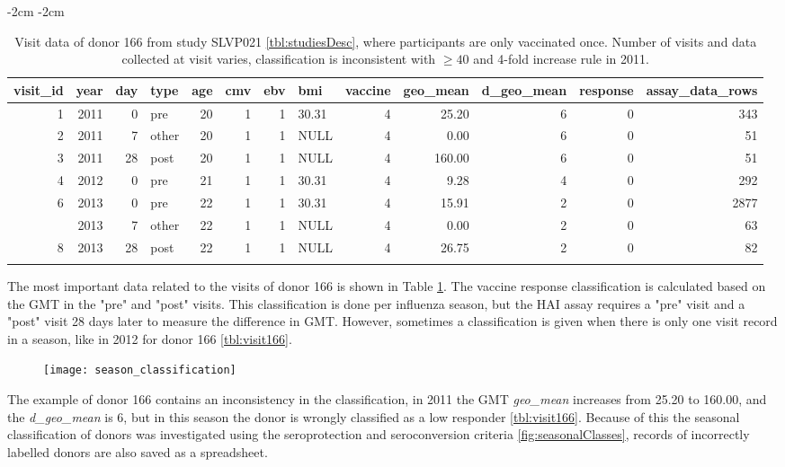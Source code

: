 \begin{table}
\addtolength{\leftskip} {-2cm} %
\addtolength{\rightskip} {-2cm} %
\begin{tabular}{rrrlrrrlrrrrr}
\toprule{}
visit\_id & year & day & type & age & cmv & ebv & bmi & vaccine & geo\_mean & d\_geo\_mean & response & assay\_data\_rows\\
\midrule{}
1 & 2011 & 0 & pre & 20 & 1 & 1 & 30.31 & 4 & 25.20 & 6 & 0 & 343\\
2 & 2011 & 7 & other & 20 & 1 & 1 & NULL & 4 & 0.00 & 6 & 0 & 51\\
3 & 2011 & 28 & post & 20 & 1 & 1 & NULL & 4 & 160.00 & 6 & 0 & 51\\
4 & 2012 & 0 & pre & 21 & 1 & 1 & 30.31 & 4 & 9.28 & 4 & 0 & 292\\
6 & 2013 & 0 & pre & 22 & 1 & 1 & 30.31 & 4 & 15.91 & 2 & 0 & 2877\\
\addlinespace
7 & 2013 & 7 & other & 22 & 1 & 1 & NULL & 4 & 0.00 & 2 & 0 & 63\\
8 & 2013 & 28 & post & 22 & 1 & 1 & NULL & 4 & 26.75 & 2 & 0 & 82\\
\bottomrule{}
\end{tabular}
\caption{Visit data of donor 166 from study SLVP021 \autoref{tbl:studiesDesc},
where participants are only vaccinated once.
Number of visits and data collected at visit varies, classification is
inconsistent with \( \geq 40\) and 4-fold increase
rule in 2011.}\label{tbl:visit166}
\end{table}

The most important data related to the visits of donor 166 is shown in Table
\ref{tbl:visit166}.  The vaccine response classification is calculated based on
the GMT in the "pre" and "post" visits.  This classification is done per
influenza season, but the HAI assay requires a "pre" visit and a "post" visit
28 days later to measure the difference in GMT.  However, sometimes a
classification is given when there is only one visit record in a season, like
in 2012 for donor 166 \autoref{tbl:visit166}.

\begin{figure}
    \texttt{[image: season\_classification]}
    \caption{}\label{fig:classInconsistent}
\end{figure}

The example of donor 166 contains an inconsistency in the classification, in
2011 the GMT \textit{geo\_mean} increases from 25.20 to 160.00, and the
\textit{d\_geo\_mean} is 6, but in this season the donor is wrongly classified
as a low responder \autoref{tbl:visit166}. Because of this the seasonal
classification of donors was investigated using the seroprotection and
seroconversion criteria \ref{fig:seasonalClasses}, records of incorrectly
labelled donors are also saved as a spreadsheet.

